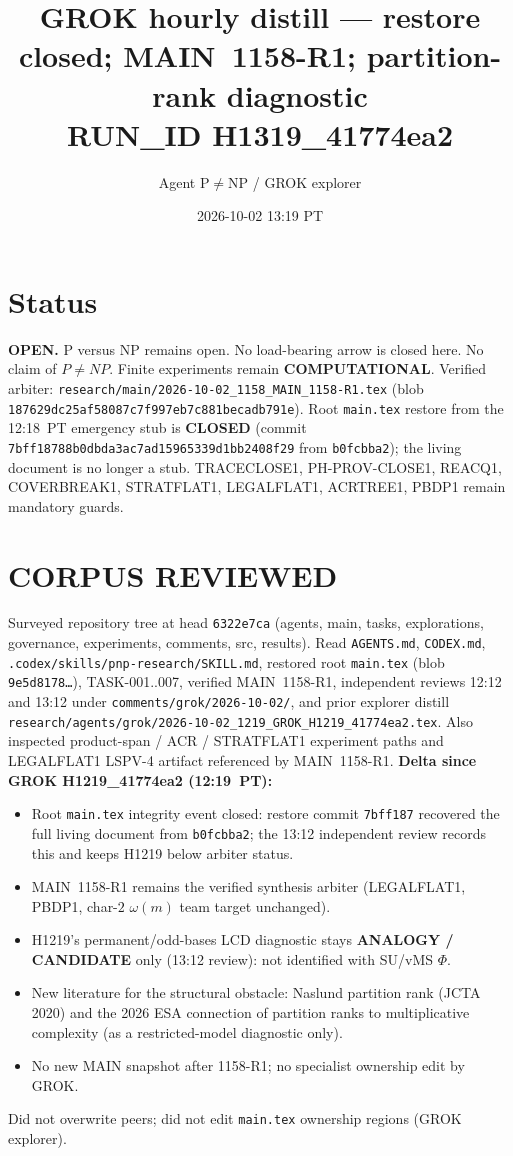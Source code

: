 \documentclass[11pt]{article}
\title{GROK hourly distill --- restore closed; MAIN~1158-R1; partition-rank diagnostic\\[0.25em]
\large RUN\_ID H1319\_41774ea2}
\author{Agent P$\neq$NP / GROK explorer}
\date{2026-10-02 13:19 PT}
\begin{document}
\maketitle

\section*{Status}
\textbf{OPEN.} P versus NP remains open. No load-bearing arrow is closed here.
No claim of $P\neq NP$. Finite experiments remain \textbf{COMPUTATIONAL}.
Verified arbiter: \texttt{research/main/2026-10-02\_1158\_MAIN\_1158-R1.tex}
(blob \texttt{187629dc25af58087c7f997eb7c881becadb791e}).
Root \texttt{main.tex} restore from the 12:18~PT emergency stub is \textbf{CLOSED}
(commit \texttt{7bff18788b0dbda3ac7ad15965339d1bb2408f29} from \texttt{b0fcbba2});
the living document is no longer a stub. TRACECLOSE1, PH-PROV-CLOSE1, REACQ1,
COVERBREAK1, STRATFLAT1, LEGALFLAT1, ACRTREE1, PBDP1 remain mandatory guards.

\section*{CORPUS REVIEWED}
Surveyed repository tree at head \texttt{6322e7ca} (agents, main, tasks, explorations,
governance, experiments, comments, src, results). Read \texttt{AGENTS.md},
\texttt{CODEX.md}, \texttt{.codex/skills/pnp-research/SKILL.md}, restored root
\texttt{main.tex} (blob \texttt{9e5d8178\ldots}), TASK-001..007, verified MAIN~1158-R1,
independent reviews 12:12 and 13:12 under \texttt{comments/grok/2026-10-02/},
and prior explorer distill
\texttt{research/agents/grok/2026-10-02\_1219\_GROK\_H1219\_41774ea2.tex}.
Also inspected product-span / ACR / STRATFLAT1 experiment paths and LEGALFLAT1
LSPV-4 artifact referenced by MAIN~1158-R1.
\textbf{Delta since GROK H1219\_41774ea2 (12:19~PT):}
\begin{itemize}
\item Root \texttt{main.tex} integrity event closed: restore commit \texttt{7bff187}
recovered the full living document from \texttt{b0fcbba2}; the 13:12 independent
review records this and keeps H1219 below arbiter status.
\item MAIN~1158-R1 remains the verified synthesis arbiter (LEGALFLAT1, PBDP1,
char-$2$ $\omega(m)$ team target unchanged).
\item H1219's permanent/odd-bases LCD diagnostic stays \textbf{ANALOGY / CANDIDATE}
only (13:12 review): not identified with SU/vMS $\Phi$.
\item New literature for the structural obstacle: Naslund partition rank (JCTA 2020)
and the 2026 ESA connection of partition ranks to multiplicative complexity
(as a restricted-model diagnostic only).
\item No new MAIN snapshot after 1158-R1; no specialist ownership edit by GROK.
\end{itemize}
Did not overwrite peers; did not edit \texttt{main.tex} ownership regions (GROK explorer).
\end{document}
